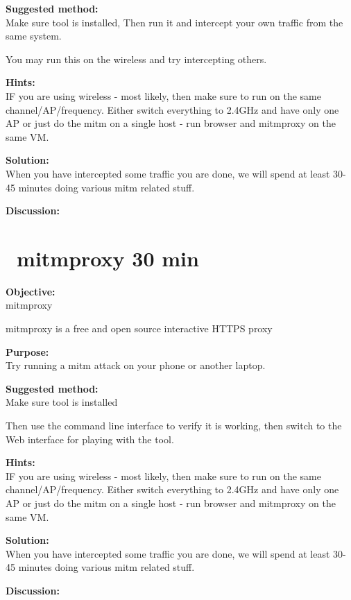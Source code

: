 \documentclass[a4paper,11pt,notitlepage]{report}
\begin{document}
{\bf Suggested method:}\\
Make sure tool is installed, Then run it and intercept your own traffic from the same system.

You may run this on the wireless and try intercepting others.

{\bf Hints:}\\
IF you are using wireless - most likely, then make sure to run on the same channel/AP/frequency. Either switch everything to 2.4GHz and have only one AP or just do the mitm on a single host - run browser and mitmproxy on the same VM.

{\bf Solution:}\\
When you have intercepted some traffic you are done, we will spend at least 30-45 minutes doing various mitm related stuff.

{\bf Discussion:}\\



\chapter{\faInfoCircle\ mitmproxy 30 min}
\label{ex:mitmproxy}

{\bf Objective:}\\
mitmproxy 

mitmproxy is a free and open source interactive HTTPS proxy

{\bf Purpose:}\\
Try running a mitm attack on your phone or another laptop.

{\bf Suggested method:}\\
Make sure tool is installed

Then use the command line interface to verify it is working, then switch to the Web interface for playing with the tool.

{\bf Hints:}\\
IF you are using wireless - most likely, then make sure to run on the same channel/AP/frequency. Either switch everything to 2.4GHz and have only one AP or just do the mitm on a single host - run browser and mitmproxy on the same VM.

{\bf Solution:}\\
When you have intercepted some traffic you are done, we will spend at least 30-45 minutes doing various mitm related stuff.

{\bf Discussion:}\\
\end{document}

